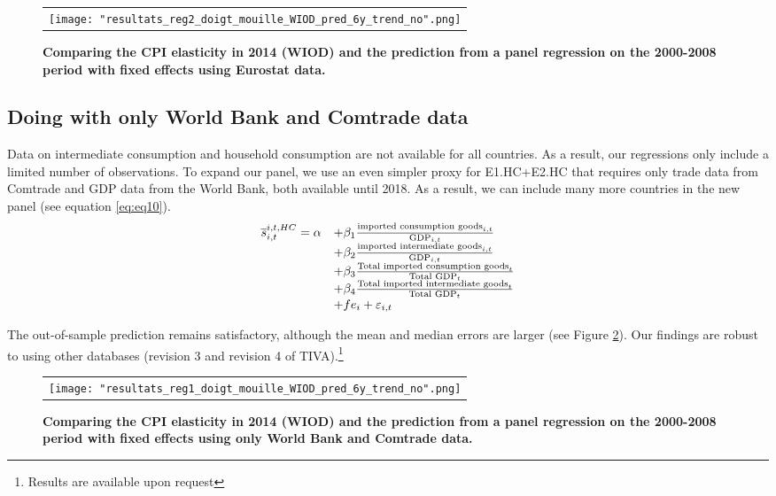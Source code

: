 \documentclass[11pt,a4paper]{article}
\begin{document}
\begin{figure}[!h]
	\centering
	\caption{\footnotesize{\textbf{Comparing the CPI elasticity in 2014 (WIOD) and the prediction from a panel regression on the 2000-2008 period with fixed effects using Eurostat data.}}}
	\begin{tabular}{c}
		\texttt{[image: "resultats\_reg2\_doigt\_mouille\_WIOD\_pred\_6y\_trend\_no".png]}\\
	\end{tabular}
	\label{fig:panel_pred1}
\end{figure}

\subsection{Doing with only World Bank and Comtrade data}
Data on intermediate consumption and household consumption are not available for all countries.
As a result, our regressions only include a limited number of observations.
To expand our panel, we use an even simpler proxy for E1.HC+E2.HC that requires only trade data from Comtrade and GDP data from the World Bank, both available until 2018. 
As a result, we can include many more countries in the new panel (see equation \ref{eq:eq10}).
 \begin{equation}
\begin{array}{llll}
\overline{s}_{i,t}^{i,t,HC}= \alpha & +  \beta_1  \frac{\textnormal{imported consumption goods}_{i,t}}{\textnormal{GDP}_{i,t}} \\ & + \beta_2 \frac{\textnormal{imported intermediate goods}_{i,t}}{\textnormal{GDP}_{i,t}} \\
& +  \beta_3  \frac{\textnormal{Total imported consumption goods}_{t}}{\textnormal{Total GDP}_{t}} \\
& + \beta_4 \frac{\textnormal{Total imported intermediate goods}_{t}}{\textnormal{Total GDP}_{t}} \\
& +fe_{i}+\varepsilon_{i,t}
\end{array}
\label{eq:eq10}
\end{equation}

The out-of-sample prediction remains satisfactory, although the mean and median errors are larger (see Figure \ref{fig:panel_pred2}). 
Our findings are robust to using other databases (revision 3 and revision 4 of TIVA).\footnote{Results are available upon request}


\begin{figure}[!h]
	\centering
	\caption{\footnotesize{\textbf{Comparing the CPI elasticity in 2014 (WIOD) and the prediction from a panel regression on the 2000-2008 period with fixed effects using only World Bank and Comtrade data. }}}
	\begin{tabular}{c}
		\texttt{[image: "resultats\_reg1\_doigt\_mouille\_WIOD\_pred\_6y\_trend\_no".png]}\\
	\end{tabular}
	\label{fig:panel_pred2}
\end{figure}
\end{document}
